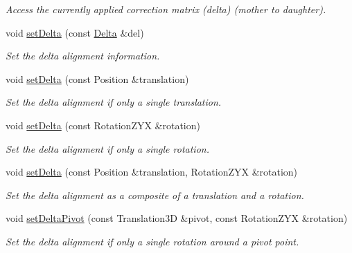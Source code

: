 \begin{DoxyCompactItemize}
\begin{DoxyCompactList}\small\item\em Access the currently applied correction matrix (delta) (mother to daughter). \item\end{DoxyCompactList}\item 
void \hyperlink{class_d_d4hep_1_1_alignments_1_1_alignment_decorator_a6eec8976056b3a07c214ad809f403b67}{setDelta} (const \hyperlink{class_d_d4hep_1_1_alignments_1_1_delta}{Delta} \&del)
\begin{DoxyCompactList}\small\item\em Set the delta alignment information. \item\end{DoxyCompactList}\item 
void \hyperlink{class_d_d4hep_1_1_alignments_1_1_alignment_decorator_a46ef14105fac953846eba7dc798f3357}{setDelta} (const Position \&translation)
\begin{DoxyCompactList}\small\item\em Set the delta alignment if only a single translation. \item\end{DoxyCompactList}\item 
void \hyperlink{class_d_d4hep_1_1_alignments_1_1_alignment_decorator_a27ae7e7f8aba1fed3c76ab63f985a627}{setDelta} (const RotationZYX \&rotation)
\begin{DoxyCompactList}\small\item\em Set the delta alignment if only a single rotation. \item\end{DoxyCompactList}\item 
void \hyperlink{class_d_d4hep_1_1_alignments_1_1_alignment_decorator_a123e789de1fa9b3c4cb0149d6831b287}{setDelta} (const Position \&translation, RotationZYX \&rotation)
\begin{DoxyCompactList}\small\item\em Set the delta alignment as a composite of a translation and a rotation. \item\end{DoxyCompactList}\item 
void \hyperlink{class_d_d4hep_1_1_alignments_1_1_alignment_decorator_aa162f47918e614d0c3c11e6b584d1a1b}{setDeltaPivot} (const Translation3D \&pivot, const RotationZYX \&rotation)
\begin{DoxyCompactList}\small\item\em Set the delta alignment if only a single rotation around a pivot point. \item\end{DoxyCompactList}\item 

\end{DoxyCompactItemize}
